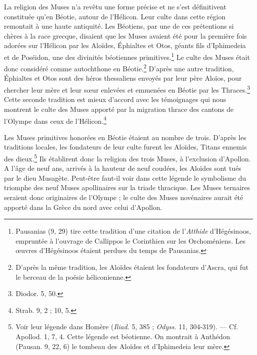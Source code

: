 \documentclass[a4paper, 11pt, oneside, polutonikogreek, french]{article}
\begin{document}
La religion des Muses n'a revêtu une forme précise et ne s'est définitivent constituée qu'en Béotie, autour de l'Hélicon. Leur culte dans cette région remontait à une haute antiquité. Les Béotiens, par une de ces prétentions si chères à la race grecque, disaient que les Muses avaient été pour la première fois adorées sur l'Hélicon par les Aloïdes, Éphialtes et Otos, géants fils d'Iphimedeia et de Poséidon, une des divinités béotiennes primitives.\footnote{Pausanias (9, 29) tire cette tradition d'une citation de l'\emph{Atthide} d'Hégésinoos, empruntée à l'ouvrage de Callippos le Corinthien sur les Orchoméniens. Les œuvres d'Hégésinoos étaient perdues du temps de Pausanias.} Le culte des Muses était donc considéré comme autochthone en Béotie.\footnote{D'après la même tradition, les Aloïdes étaient les fondateurs d'Ascra, qui fut le berceau de la poésie héliconienne.} D'après une autre tradition, Éphialtes et Otos sont des héros thessaliens envoyés par leur père Aloïos, pour chercher leur mère et leur sœur enlevées et emmenées en Béotie par les Thraces.\footnote{Diodor. 5, 50.} Cette seconde tradition est mieux d'accord avec les témoignages qui nous montrent le culte des Muses apporté par la migration thrace des cantons de l'Olympe dans ceux de l'Hélicon.\footnote{Strab. 9, 2 ; 10, 5.}

Les Muses primitives honorées en Béotie étaient au nombre de trois. D'après les traditions locales, les fondateurs de leur culte furent les Aloïdes, Titans ennemis des dieux.\footnote{Voir leur légende dans Homère (\emph{Iliad.} 5, 385 ; \emph{Odyss.} 11, 304-319). --- Cf. Apollod. 1, 7, 4. Cette légende est béotienne. On montrait à Anthédon (Pausan. 9, 22, 6) le tombeau des Aloïdes et d'Iphimedeia leur mère.} Ils établirent donc la religion des trois Muses, à l'exclusion d'Apollon. A l'âge de neuf ans, arrivés à la hauteur de neuf coudées, les Aloïdes sont tués par le dieu Musagète. Peut-être faut-il voir dans cette légende le symbolisme du triomphe des neuf Muses apollinaires sur la triade thracique. Les Muses ternaires seraient donc originaires de l'Olympe ; le culte des Muses novénaires aurait été apporté dans la Grèce du nord avec celui d'Apollon.
\end{document}
